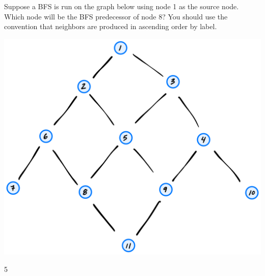 \begin{prob}
    Suppose a BFS is run on the graph below using node 1 as the source node. Which
    node will be the BFS predecessor of node 8? You should use the convention that neighbors
    are produced in ascending order by label.

    \includegraphics[width=.6\textwidth]{./fig/g2.png}

    \begin{soln}
        5
    \end{soln}

\end{prob}
